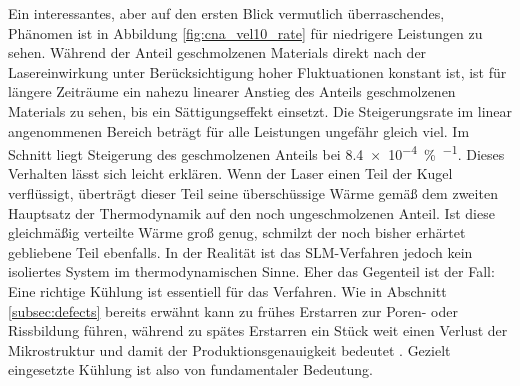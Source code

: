 		Ein interessantes, aber auf den ersten Blick vermutlich überraschendes, Phänomen ist in
		Abbildung \ref{fig:cna_vel10_rate} für niedrigere Leistungen zu sehen. Während der Anteil
		geschmolzenen Materials direkt nach der Lasereinwirkung unter Berücksichtigung hoher
		Fluktuationen konstant ist, ist für längere Zeiträume ein nahezu linearer Anstieg des
		Anteils geschmolzenen Materials zu sehen, bis ein Sättigungseffekt einsetzt. Die
		Steigerungsrate im linear angenommenen Bereich beträgt für alle Leistungen ungefähr
		gleich viel. Im Schnitt liegt Steigerung des geschmolzenen Anteils bei
		\SI{8.4e-4}{\percent\per\timeunit}. Dieses Verhalten lässt sich leicht erklären. Wenn der
		Laser einen Teil der Kugel verflüssigt, überträgt dieser Teil seine überschüssige Wärme
		gemäß dem zweiten Hauptsatz der Thermodynamik auf den noch ungeschmolzenen Anteil. Ist
		diese gleichmäßig verteilte Wärme groß genug, schmilzt der noch bisher erhärtet gebliebene
		Teil ebenfalls. In der Realität ist das SLM-Verfahren jedoch kein isoliertes System im
		thermodynamischen Sinne. Eher das Gegenteil ist der Fall: Eine richtige Kühlung ist
		essentiell für das Verfahren. Wie in Abschnitt \ref{subsec:defects} bereits erwähnt kann
		zu frühes Erstarren zur Poren- oder Rissbildung führen, während zu spätes Erstarren ein
		Stück weit einen Verlust der Mikrostruktur und damit der Produktionsgenauigkeit bedeutet
		\cite{sercombe2016selective}. Gezielt eingesetzte Kühlung ist also von fundamentaler
		Bedeutung.

